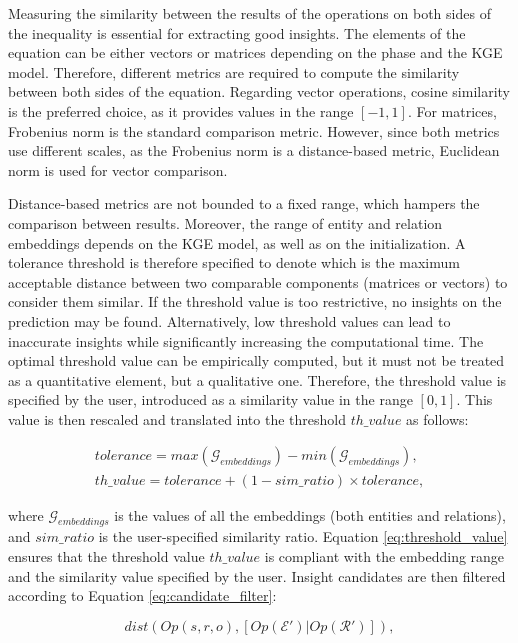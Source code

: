 Measuring the similarity between the results of the operations on both sides of the inequality is essential for extracting good insights. The elements of the equation can be either vectors or matrices depending on the phase and the KGE model. Therefore, different metrics are required to compute the similarity between both sides of the equation. Regarding vector operations, cosine similarity is the preferred choice, as it provides values in the range $[-1,1]$. For matrices, Frobenius norm is the standard comparison metric. However, since both metrics use different scales, as the Frobenius norm is a distance-based metric, Euclidean norm is used for vector comparison. 

Distance-based metrics are not bounded to a fixed range, which hampers the comparison between results. Moreover, the range of entity and relation embeddings depends on the KGE model, as well as on the initialization. A tolerance threshold is therefore specified to denote which is the maximum acceptable distance between two comparable components (matrices or vectors) to consider them similar. If the threshold value is too restrictive, no insights on the prediction may be found. Alternatively, low threshold values can lead to inaccurate insights while significantly increasing the computational time. The optimal threshold value can be empirically computed, but it must not be treated as a quantitative element, but a qualitative one. Therefore, the threshold value is specified by the user, introduced as a similarity value in the range $[0,1]$. This value is then rescaled and translated into the threshold $th\_value$ as follows:

\begin{align} 
   tolerance = max(\mathcal{G}_{embeddings})- min(\mathcal{G}_{embeddings}), \nonumber  \\
    th\_value = tolerance + ( 1 - sim\_ratio ) \times  tolerance,
\label{eq:threshold_value}
\end{align}

where $\mathcal{G}_{embeddings}$ is the values of all the embeddings (both entities and relations), and $sim\_ratio$ is the user-specified similarity ratio. Equation \ref{eq:threshold_value} ensures that the threshold value $th\_value$ is compliant with the embedding range and the similarity value specified by the user. Insight candidates are then filtered according to Equation \ref{eq:candidate_filter}:

\begin{equation}\label{eq:candidate_filter}
    dist( Op(s,r,o),  [Op(\mathcal{E}') | Op(\mathcal{R}')] ),
\end{equation}

